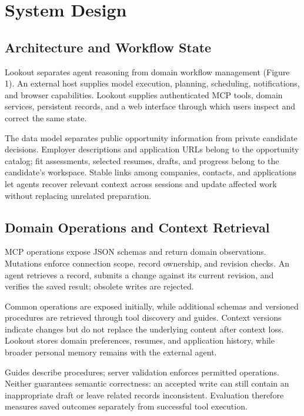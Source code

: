 \documentclass[twocolumn]{article}
\begin{document}
\section{System Design}

\subsection{Architecture and Workflow State}

Lookout separates agent reasoning from domain workflow management (Figure 1). An external host supplies model execution, planning, scheduling, notifications, and browser capabilities. Lookout supplies authenticated MCP tools, domain services, persistent records, and a web interface through which users inspect and correct the same state.

The data model separates public opportunity information from private candidate decisions. Employer descriptions and application URLs belong to the opportunity catalog; fit assessments, selected resumes, drafts, and progress belong to the candidate's workspace. Stable links among companies, contacts, and applications let agents recover relevant context across sessions and update affected work without replacing unrelated preparation.

\subsection{Domain Operations and Context Retrieval}

MCP operations expose JSON schemas and return domain observations. Mutations enforce connection scope, record ownership, and revision checks. An agent retrieves a record, submits a change against its current revision, and verifies the saved result; obsolete writes are rejected.

Common operations are exposed initially, while additional schemas and versioned procedures are retrieved through tool discovery and guides. Context versions indicate changes but do not replace the underlying content after context loss. Lookout stores domain preferences, resumes, and application history, while broader personal memory remains with the external agent.

Guides describe procedures; server validation enforces permitted operations. Neither guarantees semantic correctness: an accepted write can still contain an inappropriate draft or leave related records inconsistent. Evaluation therefore measures saved outcomes separately from successful tool execution.
\end{document}
